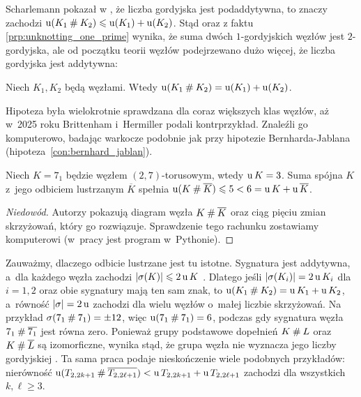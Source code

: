 Scharlemann pokazał w \cite[wniosek 1.6]{scharlemann1998}, że liczba gordyjska jest podaddytywna, to znaczy zachodzi $\operatorname{u}(K_1 \mathbin{\#} K_2) \leqslant \operatorname{u}(K_1) + \operatorname{u}(K_2)$.
Stąd oraz z faktu \ref{prp:unknotting_one_prime} wynika, że suma dwóch $1$-gordyjskich węzłów jest $2$-gordyjska, ale od początku teorii węzłów podejrzewano dużo więcej, że liczba gordyjska jest addytywna:

\begin{conjecture}
%
\label{conjecture_unknotting_additive}%
    Niech $K_1, K_2$ będą węzłami.
    Wtedy $\operatorname{u} (K_1 \mathbin{\#} K_2) = \operatorname{u}(K_1) + \operatorname{u}(K_2)$.
\end{conjecture}

Hipoteza była wielokrotnie sprawdzana dla coraz większych klas węzłów, aż w~2025 roku Brittenham i~Hermiller \cite{brittenham2025} podali kontrprzykład.
%
%
Znaleźli go komputerowo, badając warkocze podobnie jak przy hipotezie Bernharda-Jablana (hipoteza~\ref{con:bernhard_jablan}).

\begin{proposition}
%
\label{prp:unknotting_not_additive}%
    Niech $K = 7_1$ będzie węzłem $(2,7)$-torusowym, wtedy $\operatorname{u} K = 3$.
    Suma spójna $K$ z~jego odbiciem lustrzanym $\overline K$ spełnia $\operatorname{u}(K \mathbin{\#} \overline K) \leqslant 5 < 6 = \operatorname{u} K + \operatorname{u} \overline K$.
\end{proposition}

\begin{proof}[Niedowód]
    Autorzy pokazują diagram węzła $K \mathbin{\#} \overline K$ oraz ciąg pięciu zmian skrzyżowań, który go rozwiązuje.
    Sprawdzenie tego rachunku zostawiamy komputerowi (w~pracy \cite{brittenham2025} jest program w~Pythonie).
\end{proof}

Zauważmy, dlaczego odbicie lustrzane jest tu istotne.
Sygnatura jest addytywna, a~dla każdego węzła zachodzi $|\sigma(K)| \leqslant 2 \operatorname{u} K$ \cite[s. 142]{livingston1993}.
Dlatego jeśli $|\sigma(K_i)| = 2 \operatorname{u} K_i$ dla $i = 1, 2$ oraz obie sygnatury mają ten sam znak, to $\operatorname{u}(K_1 \mathbin{\#} K_2) = \operatorname{u} K_1 + \operatorname{u} K_2$, a~równość $|\sigma| = 2 \operatorname{u}$ zachodzi dla wielu węzłów o~małej liczbie skrzyżowań.
Na przykład $\sigma(7_1 \mathbin{\#} 7_1) = \pm 12$, więc $\operatorname{u}(7_1 \mathbin{\#} 7_1) = 6$, podczas gdy sygnatura węzła $7_1 \mathbin{\#} \overline{7_1}$ jest równa zero.
Ponieważ grupy podstawowe dopełnień $K \mathbin{\#} L$ oraz $K \mathbin{\#} \overline L$ są izomorficzne, wynika stąd, że grupa węzła nie wyznacza jego liczby gordyjskiej \cite{brittenham2025}.
Ta sama praca podaje nieskończenie wiele podobnych przykładów: nierówność $\operatorname{u}(T_{2,2k+1} \mathbin{\#} \overline{T_{2,2\ell+1}}) < \operatorname{u} T_{2,2k+1} + \operatorname{u} T_{2,2\ell+1}$ zachodzi dla wszystkich $k, \ell \ge 3$.

